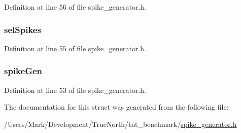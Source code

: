 Definition at line 56 of file spike\+\_\+generator.\+h.

\hypertarget{structspike_gen_state_a2da60d116861755bbeeb531a01124cb0}{}
\subsubsection[{sel\+Spikes}]{ sel\+Spikes}\label{structspike_gen_state_a2da60d116861755bbeeb531a01124cb0}


Definition at line 55 of file spike\+\_\+generator.\+h.

\hypertarget{structspike_gen_state_ae40f21a48f3157bcad074f424046ed2c}{}
\subsubsection[{spike\+Gen}]{ spike\+Gen}\label{structspike_gen_state_ae40f21a48f3157bcad074f424046ed2c}


Definition at line 53 of file spike\+\_\+generator.\+h.



The documentation for this struct was generated from the following file\+:\begin{DoxyCompactItemize}
\item 
/\+Users/\+Mark/\+Development/\+True\+North/tnt\+\_\+benchmark/\hyperlink{spike__generator_8h}{spike\+\_\+generator.\+h}\end{DoxyCompactItemize}
